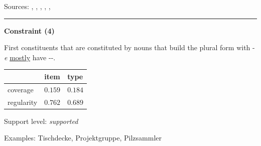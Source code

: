 \vspace{0.3em}

\noindent
Sources: \citet[227]{eisenberg_2013}, \citet[572]{fuhrhop_kuerschner_2015}, \citet[9]{kuerschner_2010}, \citet[78]{nuebling_szczepaniak_2013}, \citet[83, 106]{ortner_mueller-bollhagen_1991}, \citet[229]{schaefer_2018}


\hrule




\vspace{0.4em}

\begin{center}
\textbf{Constraint (4)}
\end{center}

\noindent
First constituents that are constituted by nouns that build the plural form with -\textit{e} \underline{mostly} have \mbox{-{\zeroLinker}-}.
\vspace{0.35em}


\vspace{-0.35em}

\begin{table}[!ht]
\begin{center}

\begin{tabularx}{\columnwidth}{|X|X|X|}
\hline
 & item & type \\
\hline
 coverage & $0.159$ & $0.184$ \\
\hline
 regularity & $0.762$ & $0.689$ \\
\hline
\end{tabularx}
\end{center}
\end{table}

\vspace{-1.35em}

\noindent
Support level: \textit{supported}

\vspace{0.3em}

\noindent
Examples: Tisch{\zeroLinker}decke, Projekt{\zeroLinker}gruppe, Pilz{\zeroLinker}sammler

